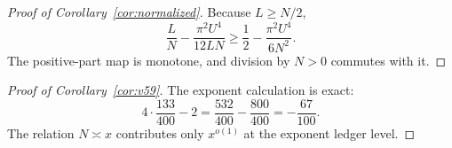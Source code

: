 \begin{proof}[Proof of Corollary~\ref{cor:normalized}]
Because \(L\geq N/2\),
\[
\frac LN-\frac{\pi^2U^4}{12LN}
\geq\frac12-\frac{\pi^2U^4}{6N^2}.
\]
The positive-part map is monotone, and division by \(N>0\) commutes with it.
\end{proof}

\begin{proof}[Proof of Corollary~\ref{cor:v59}]
The exponent calculation is exact:
\[
4\cdot\frac{133}{400}-2
=\frac{532}{400}-\frac{800}{400}
=-\frac{67}{100}.
\]
The relation \(N\asymp x\) contributes only \(x^{o(1)}\) at the exponent
ledger level.
\end{proof}

